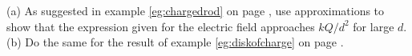 (a) As suggested in example \ref{eg:chargedrod} on page \pageref{eg:chargedrod},
        use approximations to show that the expression given for the
        electric field approaches $kQ/d^2$ for large $d$.\hwendpart
        (b) Do the same for the result of example \ref{eg:diskofcharge}
        on page \pageref{eg:diskofcharge}.
